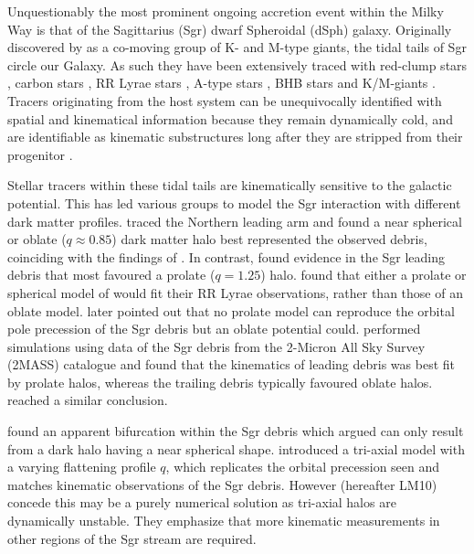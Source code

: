 Unquestionably the most prominent ongoing accretion event within the Milky Way is that of the Sagittarius (Sgr) dwarf Spheroidal (dSph) galaxy. Originally discovered by \citet{Ibata;et-al_1994} as a co-moving group of K- and M-type giants, the tidal tails of Sgr circle our Galaxy. As such they have been extensively traced with red-clump stars \citep{Majewski;et-al_1999}, carbon stars \citep{Totten;Irwin_1998, Ibata;et-al_2001}, RR Lyrae stars \citep{Ivezic;et-al_2000, Vivas;et-al_2005, Keller;et-al_2008, Watkins;et-al_2009, Prior;et-al_2009b}, A-type stars \citep{Newberg;et-al_2003}, BHB stars \citep{Ruhland;et-al_2011} and K/M-giants \citep{Majewski;et-al_2003,  Yanny;et-al_2009, Keller;Yong;Da_Costa_2010}. Tracers originating from the host system can be unequivocally identified with spatial and kinematical information because they remain dynamically cold, and are identifiable as kinematic substructures long after they are stripped from their progenitor \citep[for example][]{Ibata;Lewis_1998, Helmi;White_1999}. 
	
Stellar tracers within these tidal tails are kinematically sensitive to the galactic potential. This has led various groups to model the Sgr interaction with different dark matter profiles. \citet{Martinez-Delgado;et-al_2004} traced the Northern leading arm and found a near spherical or oblate ($q \approx 0.85$) dark matter halo best represented the observed debris, coinciding with the findings of \citet{Ibata;et-al_2001}. In contrast, \citet{Helmi_2004} found evidence in the Sgr leading debris that most favoured a prolate ($q = 1.25$) halo. \citet{Vivas;et-al_2005} found that either a prolate or spherical model of  \citet{Helmi_2004} would fit their RR Lyrae observations, rather than those of an oblate model. \citet{Johnston;et-al_2005} later pointed out that no prolate model can reproduce the orbital pole precession of the Sgr debris but an oblate potential could. \citet[hereafter LJM05]{Law;et-al_2005} performed simulations using data of the Sgr debris from the 2-Micron All Sky Survey (2MASS) catalogue and found that the kinematics of leading debris was best fit by prolate halos, whereas the trailing debris typically favoured oblate halos. \citet{Prior;et-al_2009a} reached a similar conclusion.
	
\citet{Belokurov;et-al_2006} found an apparent bifurcation within the Sgr debris which \citet{Fellhauer;et-al_2006} argued can only result from a dark halo having a near spherical shape. \citet{Law;et-al_2009} introduced a tri-axial model with a varying flattening profile $q$, which replicates the orbital precession seen and matches kinematic observations of the Sgr debris. However \citet{Law;Majewski_2010} (hereafter LM10) concede this may be a purely numerical solution as tri-axial halos are dynamically unstable. They emphasize that  more kinematic measurements in other regions of the Sgr stream are required.

